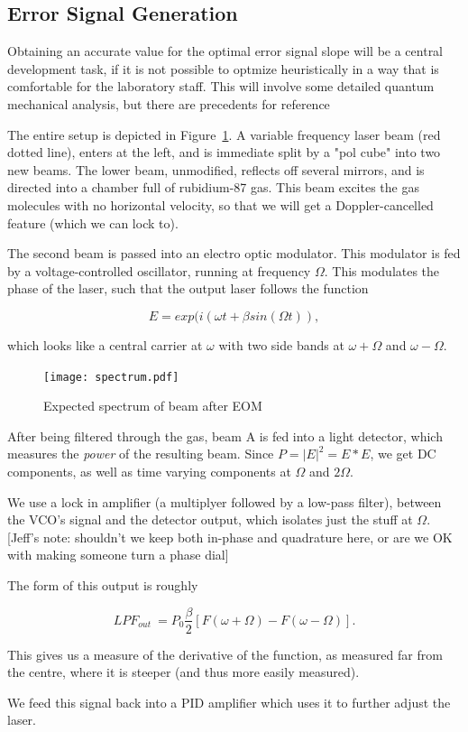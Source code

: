 \subsection{Error Signal Generation}

Obtaining an accurate value for the optimal error signal slope will be a central
development task, if it is not possible to optmize heuristically in a way that
is comfortable for the laboratory staff. This will involve some detailed
quantum mechanical analysis, but there are precedents for reference
\cite{maguire2006}

The entire setup is depicted in Figure~\ref{setup}.  A variable frequency laser beam (red dotted line), enters at the left, and is immediate split by a "pol cube" into two new beams.  The lower beam, unmodified, reflects off several mirrors, and is directed into a chamber full of rubidium-87 gas.  This beam excites the gas molecules with no horizontal velocity, so that we will get a Doppler-cancelled feature (which we can lock to).

The second beam is passed into an electro optic modulator.  This modulator is fed by a voltage-controlled oscillator, running at frequency $\Omega$.  This modulates the phase of the laser, such that the output laser follows the function

\[ E = exp(i(\omega t + \beta sin(\Omega t)), \]

which looks like a central carrier at $\omega$ with two side bands at $\omega + \Omega$ and $\omega - \Omega$.

\begin{figure}
  \centering
  \label{setup}
  \texttt{[image: spectrum.pdf]}
  \caption{Expected spectrum of beam after EOM}
\end{figure}

After being filtered through the gas, beam A is fed into a light detector, which measures the \emph{power} of the resulting beam.  Since $P = |E|^2 = E*E$, we get DC components, as well as time varying components at $\Omega$ and $2 \Omega$.

We use a lock in amplifier (a multiplyer followed by a low-pass filter), between the VCO's signal and the detector output, which isolates just the stuff at $\Omega$.  [Jeff's note: shouldn't we keep both in-phase and quadrature here, or are we OK with making someone turn a phase dial]

The form of this output is roughly

\[ LPF_{out} ~= P_0 \frac{\beta}{2} [ F(\omega + \Omega) - F(\omega - \Omega) ]. \]

This gives us a measure of the derivative of the function, as measured far from the centre, where it is steeper (and thus more easily measured).

We feed this signal back into a PID amplifier which uses it to further adjust the laser.


